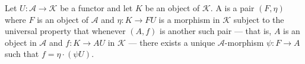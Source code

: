 Let $U: \mathcal{A} \longrightarrow \mathcal{K}$ be a functor and let $K$ be an object of $\mathcal{K}$. A  is a pair $(F, \eta)$ where $F$ is an object of $\mathcal{A}$ and $\eta: K \longrightarrow FU$ is a morphism in $\mathcal{K}$ subject to the universal property that whenever $(A, f)$ is another such pair — that is, $A$ is an object in $\mathcal{A}$ and $f: K \longrightarrow AU$ in $\mathcal{K}$ — there exists a unique $\mathcal{A}$-morphism $\psi: F \longrightarrow A$ such that $f = \eta \cdot (\psi U)$.
